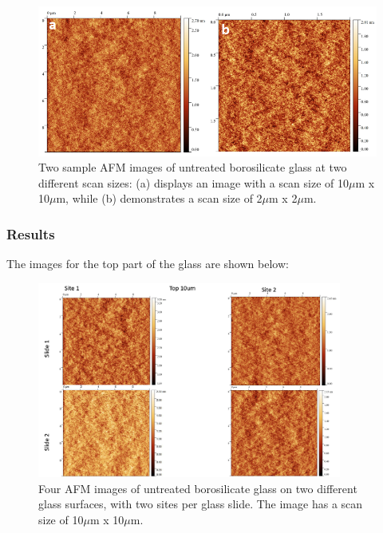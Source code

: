 \begin{figure}[h]     %
        \begin{center}
          \includegraphics[width=120mm]{chapter3/Figure9.png}
\end{center}
\caption{Two sample AFM images of untreated borosilicate glass at two different scan sizes: (a) displays an image with a scan size of 10$\mu$m x 10$\mu$m, while (b) demonstrates a scan size of 2$\mu$m x 2$\mu$m.}
\label{fig:figure9}                 %
\end{figure}   

\newpage
\subsubsection{Results}

The images for the top part of the glass are shown below:

\begin{figure}[h!!!!]     %
        \begin{center}
          \includegraphics[width=100mm]{chapter3/Top 10um.png}
\end{center}
\caption{Four AFM images of untreated borosilicate glass on two different glass surfaces, with two sites per glass slide. The image has a scan size of 10$\mu$m x 10$\mu$m.}
\label{fig:figure9}                 %
\end{figure}   

